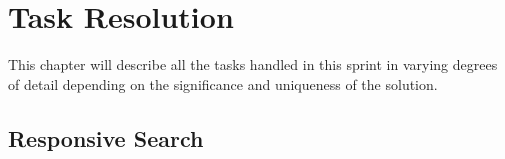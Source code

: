 \chapter{Task Resolution}
This chapter will describe all the tasks handled in this sprint in varying degrees of detail depending on the significance and uniqueness of the solution.




\section{Responsive Search}\label{RSearch}





